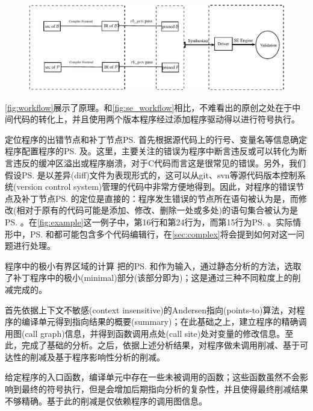\begin{figure}[t]
\begin{center}
\includegraphics[width=\textwidth]{fig/workflow.pdf}
\end{center}
\end{figure}

\autoref{fig:workflow}展示了\dryrun 原理。和\autoref{fig:se_workflow}相比，不难看出\dryrun 的原创之处在于中间代码的转化上，并且使用两个版本程序经过添加程序驱动得以进行符号执行。

\noindent\textsf{定位程序\prog 的出错节点\prog\bs 和补丁节点\prog\ps\quad } 
\dryrun 首先根据源代码上的行号、变量名等信息确定程序配置程序的\prog\ps 及\prog\bs 。这里，\dryrun 主要关注的错误为程序中断言违反或可以转化为断言违反的缓冲区溢出或程序崩溃，对于C代码而言这是很常见的错误。另外，我们假设\prog\ps 是以差异(diff)文件为表现形式的，这可以从git、svn等源代码版本控制系统(version control system)管理的代码中非常方便地得到。因此，对程序\prog 的错误节点\prog\bs 及补丁节点\prog\ps 的定位是直接的：程序发生错误的节点所在语句被认为是\prog\bs，而修改(相对于原有的代码可能是添加、修改、删除一处或多处)的语句集合被认为是\prog\ps 。在\autoref{fig:example}这一例子中，第16行和第24行为\prog\bs ，而第15行为\prog\ps 。实际情形中，\prog\ps 和\prog\bs 都可能包含多个代码编辑行，在{\autoref{sec:complex}}将会提到如何对这一问题进行处理。

\noindent\textsf{程序中的极小有界区域的计算\quad} 
把\prog 的\prog\ps 和\prog\bs 作为输入，通过静态分析的方法，\dryrun 选取了补丁程序中的极小(minimal)部分(该部分即为\rbscope)；这是通过三种不同粒度上的削减完成的。

首先依据上下文不敏感(context insensitive)的Andersen指向(points-to)算法，对程序的编译单元得到指向结果的概要(summary)；在此基础之上，建立程序的精确调用图(call graph)信息，并得到函数调用点处(call site)处对变量的修改信息。至此，完成了基础的分析。之后，依据上述分析结果，对程序做未调用削减、基于可达性的削减及基于程序影响性分析的削减。

给定程序的入口函数，编译单元中存在一些未被调用的函数；这些函数虽然不会影响到最终的符号执行，但是会增加后期指向分析的复杂性，并且使得最终削减结果不够精确。基于此的削减是仅依赖程序的调用图信息。

